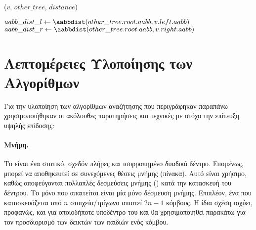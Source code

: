 \IncMargin{1.5em}
\begin{algorithm}[h]
    \caption[Απόσταση Τριγωνικών Πλεγμάτων με Δύο tl{sKD-Tree}]{
        }
    \label{alg:search_on_two_trees_recursive}
    \DontPrintSemicolon
    
    \Indm\nonl\searchtwotrees($v$, $other\_tree$, $distance$)\\
    \Indp

    $aabb\_dist\_l \gets \aabbdist(other\_tree.root.aabb, v.left.aabb)$\;
    $aabb\_dist\_r \gets \aabbdist(other\_tree.root.aabb, v.right.aabb)$\;
    \Return{}
\end{algorithm}
\DecMargin{1.5em}

\section{Λεπτομέρειες Υλοποίησης των Αλγορίθμων}
Για την υλοποίηση των αλγορίθμων αναζήτησης που περιγράφηκαν 
παραπάνω χρησιμοποιήθηκαν οι ακόλουθες παρατηρήσεις και τεχνικές
με στόχο την επίτευξη υψηλής επίδοσης:

\paragraph{Μνήμη.} 
Το  είναι ένα στατικό, σχεδόν πλήρες 
και ισορροπημένο δυαδικό δέντρο. 
Επομένως, μπορεί να αποθηκευτεί σε συνεχόμενες θέσεις μνήμης 
(πίνακα). 
Αυτό είναι χρήσιμο, καθώς αποφεύγονται πολλαπλές δεσμεύσεις 
μνήμης () κατά την κατασκευή του δέντρου. 
Το μόνο που απαιτείται είναι μία μόνο δέσμευση μνήμης.
Επιπλέον, ένα  που κατασκευάζεται από $n$ 
στοιχεία/τρίγωνα απαιτεί $2n - 1$ κόμβους. 
Η ίδια σχέση ισχύει, προφανώς, και για οποιοδήποτε 
υποδέντρο του  και θα χρησιμοποιηθεί παρακάτω
για τον προσδιορισμό των δεικτών των παιδιών ενός κόμβου.

